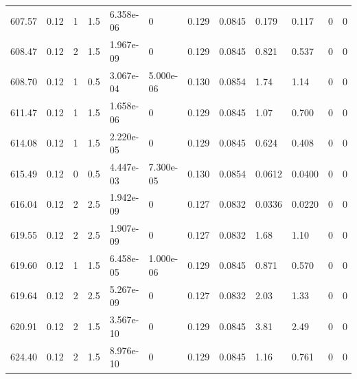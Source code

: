 \documentclass[preview]{standalone}
\begin{document}
{{{{{{{{{{\begin{tabular}{L{1.2cm}C{1.2cm} C{0.3cm}C{0.5cm} C{1.4cm}C{1.4cm} C{1.4cm}C{1.4cm} C{1.6cm}C{1.6cm} C{1.6cm}C{1.6cm}}
  607.57  &  0.12  & 1     & 1.5 &  6.358e-06  & 0  &  0.129&   0.0845& 0.179 & 0.117   &  0 & 0  \\ 
  608.47  &  0.12  & 2     & 1.5 &  1.967e-09  & 0  &  0.129&   0.0845& 0.821 & 0.537   &  0 & 0  \\ 
  608.70  &  0.12  & 1     & 0.5 &  3.067e-04  & 5.000e-06  &  0.130&   0.0854& 1.74 & 1.14   &  0 & 0  \\ 
  611.47  &  0.12  & 1     & 1.5 &  1.658e-06  & 0  &  0.129&   0.0845& 1.07 & 0.700   &  0 & 0  \\ 
  614.08  &  0.12  & 1     & 1.5 &  2.220e-05  & 0  &  0.129&   0.0845& 0.624 & 0.408   &  0 & 0  \\ 
  615.49  &  0.12  & 0     & 0.5 &  4.447e-03  & 7.300e-05  &  0.130&   0.0854& 0.0612 & 0.0400   &  0 & 0  \\ 
  616.04  &  0.12  & 2     & 2.5 &  1.942e-09  & 0  &  0.127&   0.0832& 0.0336 & 0.0220   &  0 & 0  \\ 
  619.55  &  0.12  & 2     & 2.5 &  1.907e-09  & 0  &  0.127&   0.0832& 1.68 & 1.10   &  0 & 0  \\ 
  619.60  &  0.12  & 1     & 1.5 &  6.458e-05  & 1.000e-06  &  0.129&   0.0845& 0.871 & 0.570   &  0 & 0  \\ 
  619.64  &  0.12  & 2     & 2.5 &  5.267e-09  & 0  &  0.127&   0.0832& 2.03 & 1.33   &  0 & 0  \\ 
  620.91  &  0.12  & 2     & 1.5 &  3.567e-10  & 0  &  0.129&   0.0845& 3.81 & 2.49   &  0 & 0  \\ 
  624.40  &  0.12  & 2     & 1.5 &  8.976e-10  & 0  &  0.129&   0.0845& 1.16 & 0.761   &  0 & 0  \\ 
\hline 
\end{tabular} 

}}}}}}}}}}
\end{document}
